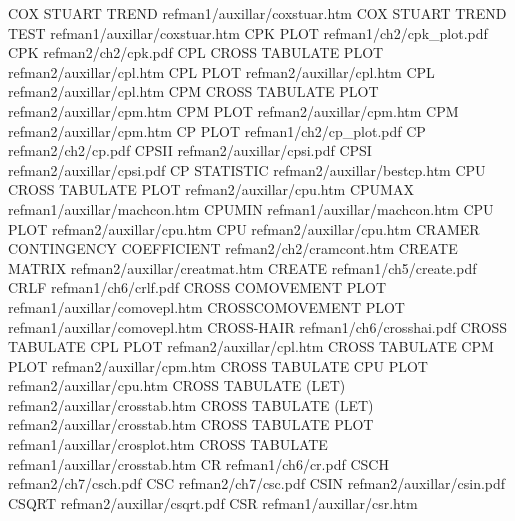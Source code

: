 COX STUART TREND                        refman1/auxillar/coxstuar.htm
COX STUART TREND TEST                   refman1/auxillar/coxstuar.htm
CPK PLOT                                refman1/ch2/cpk_plot.pdf
CPK                                     refman2/ch2/cpk.pdf
CPL CROSS TABULATE PLOT                 refman2/auxillar/cpl.htm
CPL PLOT                                refman2/auxillar/cpl.htm
CPL                                     refman2/auxillar/cpl.htm
CPM CROSS TABULATE PLOT                 refman2/auxillar/cpm.htm
CPM PLOT                                refman2/auxillar/cpm.htm
CPM                                     refman2/auxillar/cpm.htm
CP PLOT                                 refman1/ch2/cp_plot.pdf
CP                                      refman2/ch2/cp.pdf
CPSII                                   refman2/auxillar/cpsi.pdf
CPSI                                    refman2/auxillar/cpsi.pdf
CP STATISTIC                            refman2/auxillar/bestcp.htm
CPU CROSS TABULATE PLOT                 refman2/auxillar/cpu.htm
CPUMAX                                  refman1/auxillar/machcon.htm
CPUMIN                                  refman1/auxillar/machcon.htm
CPU PLOT                                refman2/auxillar/cpu.htm
CPU                                     refman2/auxillar/cpu.htm
CRAMER CONTINGENCY COEFFICIENT          refman2/ch2/cramcont.htm
CREATE MATRIX                           refman2/auxillar/creatmat.htm
CREATE                                  refman1/ch5/create.pdf
CRLF                                    refman1/ch6/crlf.pdf
CROSS COMOVEMENT PLOT                   refman1/auxillar/comovepl.htm
CROSSCOMOVEMENT PLOT                    refman1/auxillar/comovepl.htm
CROSS-HAIR                              refman1/ch6/crosshai.pdf
CROSS TABULATE CPL PLOT                 refman2/auxillar/cpl.htm
CROSS TABULATE CPM PLOT                 refman2/auxillar/cpm.htm
CROSS TABULATE CPU PLOT                 refman2/auxillar/cpu.htm
CROSS TABULATE (LET)                    refman2/auxillar/crosstab.htm
CROSS TABULATE (LET)                    refman2/auxillar/crosstab.htm
CROSS TABULATE PLOT                     refman1/auxillar/crosplot.htm
CROSS TABULATE                          refman1/auxillar/crosstab.htm
CR                                      refman1/ch6/cr.pdf
CSCH                                    refman2/ch7/csch.pdf
CSC                                     refman2/ch7/csc.pdf
CSIN                                    refman2/auxillar/csin.pdf
CSQRT                                   refman2/auxillar/csqrt.pdf
CSR                                     refman1/auxillar/csr.htm
